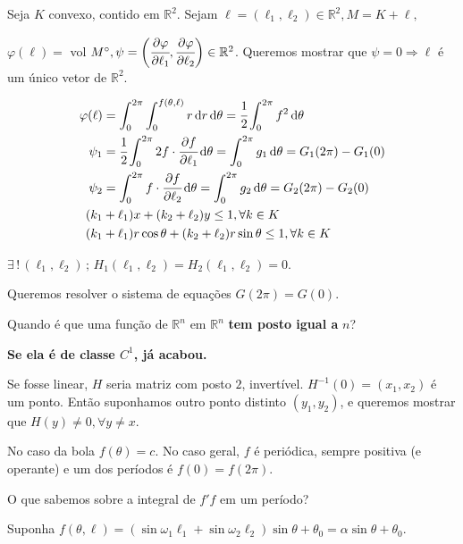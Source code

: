 \documentclass[12pt]{article}
\begin{document}
Seja $K$ convexo, contido em $\mathbb{R}^2$. Sejam $\ell = (\ell_1, \ell_2) \in \mathbb{R}^2, M = K + \ell,$

$\varphi(\ell) = $ vol $M^\circ, \psi = \bigg(\cfrac{\partial \varphi}{\partial \ell_1}, \cfrac{\partial \varphi}{\partial \ell_2} \bigg) \in \mathbb{R}^2$. Queremos mostrar que $\psi = 0 \Rightarrow \ell$ \'e um \'unico vetor de $\mathbb{R}^2$.

\begin{align}
\varphi(\ell) &= \int_0^{2\pi} \int_0^{f(\theta, \ell)} r \,\mathrm{d}r\,\mathrm{d}\theta = \cfrac{1}{2} \int_0^{2\pi} f^2\,\mathrm{d}\theta \\
\psi_1 &= \cfrac{1}{2} \int_0^{2\pi} 2f\cdot\cfrac{\partial f}{\partial \ell_1}\,\mathrm{d}\theta = \int_0^{2\pi}g_1\,\mathrm{d}\theta = G_1(2\pi) - G_1(0) \\
\psi_2 &= \int_0^{2\pi} f\cdot\cfrac{\partial f}{\partial \ell_2}\,\mathrm{d}\theta = \int_0^{2\pi}g_2\,\mathrm{d}\theta = G_2(2\pi) - G_2(0) \\
(k_1 &+ \ell_1) x + (k_2 + \ell_2) y \le 1, \forall k \in K \\
(k_1 &+ \ell_1) r \cos \theta + (k_2 + \ell_2) r \sin \theta \le 1, \forall k \in K
\end{align}

$\exists \,!\,(\ell_1,\ell_2)\,;\,H_1(\ell_1,\ell_2) = H_2(\ell_1, \ell_2) = 0$.

\vspace{3mm}

Queremos resolver o sistema de equa\c{c}\~oes $G(2\pi) = G(0)$.

Quando \'e que uma fun\c{c}\~ao de $\mathbb{R}^n$ em $\mathbb{R}^n$ \textbf{ tem posto igual a }$n$?

\textbf{Se ela \'e de classe $C^1$, j\'a acabou.}

Se fosse linear, $H$ seria matriz com posto $2$, invert\'ivel. $H^{-1}(0) = (x_1, x_2)$ \'e um ponto. Ent\~ao suponhamos outro ponto distinto $(y_1, y_2)$, e queremos mostrar que $H(y) \ne 0, \forall y \ne x$.

No caso da bola $f(\theta) = c$. No caso geral, $f$ \'e peri\'odica, sempre positiva (e operante) e um dos per\'iodos \'e $f(0) = f(2\pi)$.

O que sabemos sobre a integral de $f'f$ em um per\'iodo?

Suponha $f(\theta, \ell) = (\sin \omega_1 \ell_1 + \sin \omega_2 \ell_2) \sin \theta + \theta_0 = \alpha \sin \theta + \theta_0$.
\end{document}
